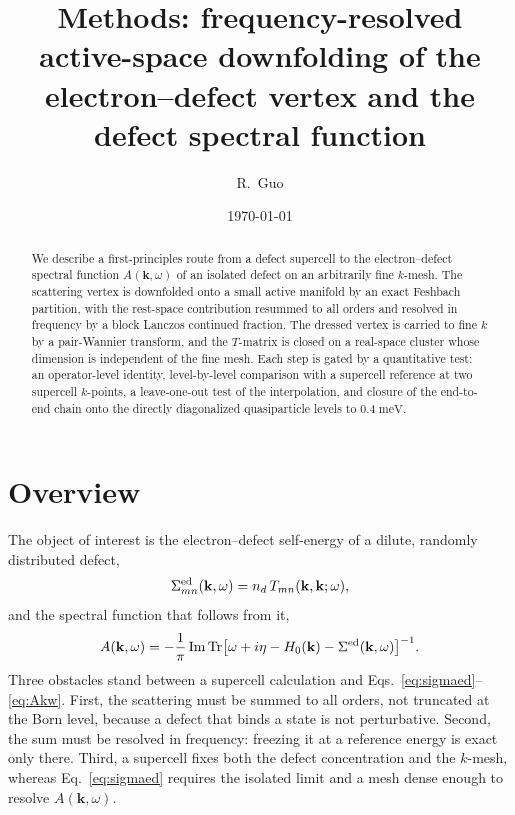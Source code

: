 \documentclass[aps,prx,reprint,superscriptaddress,nofootinbib,longbibliography]{revtex4-2}
\newcommand{\kk}{\mathbf{k}}
\newcommand{\meV}{\;\mathrm{meV}}
\begin{document}
\title{Methods: frequency-resolved active-space downfolding of the
electron--defect vertex and the defect spectral function}

\author{R.\ Guo}

\date{\today}

\begin{abstract}
We describe a first-principles route from a defect supercell to the
electron--defect spectral function $A(\kk,\omega)$ of an isolated defect on an
arbitrarily fine $k$-mesh. The scattering vertex is downfolded onto a small
active manifold by an exact Feshbach partition, with the rest-space
contribution resummed to all orders and resolved in frequency by a block
Lanczos continued fraction. The dressed vertex is carried to fine $k$ by a
pair-Wannier transform, and the $T$-matrix is closed on a real-space cluster
whose dimension is independent of the fine mesh. Each step is gated by a
quantitative test: an operator-level identity, level-by-level comparison with a
supercell reference at two supercell $k$-points, a leave-one-out test of the
interpolation, and closure of the end-to-end chain onto the directly
diagonalized quasiparticle levels to $0.4\meV$.
\end{abstract}

\maketitle

\section{Overview}

The object of interest is the electron--defect self-energy of a dilute,
randomly distributed defect,
\begin{equation}
  \Sigma^{\rm ed}_{mn}(\kk,\omega) = n_d\, T_{mn}(\kk,\kk;\omega),
  \label{eq:sigmaed}
\end{equation}
and the spectral function that follows from it,
\begin{equation}
  A(\kk,\omega) = -\frac{1}{\pi}\,\mathrm{Im}\,\mathrm{Tr}
  \big[\omega + i\eta - H_0(\kk) - \Sigma^{\rm ed}(\kk,\omega)\big]^{-1}.
  \label{eq:Akw}
\end{equation}
Three obstacles stand between a supercell calculation and
Eqs.~\eqref{eq:sigmaed}--\eqref{eq:Akw}. First, the scattering must be summed
to all orders, not truncated at the Born level, because a defect that binds a
state is not perturbative. Second, the sum must be resolved in frequency:
freezing it at a reference energy is exact only there. Third, a supercell fixes
both the defect concentration and the $k$-mesh, whereas
Eq.~\eqref{eq:sigmaed} requires the isolated limit and a mesh dense enough to
resolve $A(\kk,\omega)$.
\end{document}

